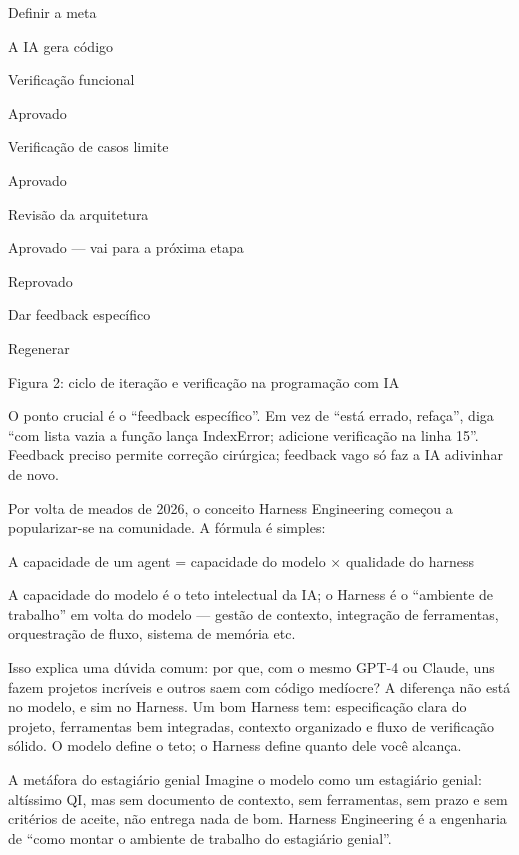 Definir a meta

A IA gera código

Verificação funcional

Aprovado

Verificação de casos limite

Aprovado

Revisão da arquitetura

Aprovado — vai para a próxima etapa

Reprovado

Dar feedback específico

Regenerar

\begin{center}\small\color{gray}Figura 2: ciclo de iteração e verificação na programação com IA\end{center}

O ponto crucial é o “feedback específico”. Em vez de “está errado, refaça”, diga “com lista vazia a função lança IndexError; adicione verificação na linha 15”. Feedback preciso permite correção cirúrgica; feedback vago só faz a IA adivinhar de novo.


Por volta de meados de 2026, o conceito Harness Engineering começou a popularizar-se na comunidade. A fórmula é simples:

A capacidade de um agent = capacidade do modelo × qualidade do harness

A capacidade do modelo é o teto intelectual da IA; o Harness é o “ambiente de trabalho” em volta do modelo — gestão de contexto, integração de ferramentas, orquestração de fluxo, sistema de memória etc.

Isso explica uma dúvida comum: por que, com o mesmo GPT-4 ou Claude, uns fazem projetos incríveis e outros saem com código medíocre? A diferença não está no modelo, e sim no Harness. Um bom Harness tem: especificação clara do projeto, ferramentas bem integradas, contexto organizado e fluxo de verificação sólido. O modelo define o teto; o Harness define quanto dele você alcança.

\begin{tcbinfo}{A metáfora do estagiário genial}
Imagine o modelo como um estagiário genial: altíssimo QI, mas sem documento de contexto, sem ferramentas, sem prazo e sem critérios de aceite, não entrega nada de bom. Harness Engineering é a engenharia de “como montar o ambiente de trabalho do estagiário genial”.

\end{tcbinfo}

